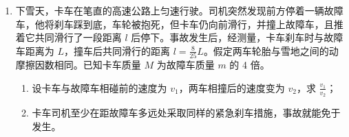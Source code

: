 \documentclass[\gkver]{gaokaozhenti}
\begin{document}
\begin{enumerate}
已知板长 $l=10\Ucm$，两板间距 $d=3.0\Ucm$，两板间电势差 $U=150\UV$，$v_{0}=2.0\times10^{7}\Ums$。

（电子所带电荷量的大小与其质量之比 $\frac{e}{m}=1.76\times10^{11}\UCkg$，电子电荷量的大小 $e=1.60\times10^{-19}\UC$）
\begin{enumerate}
	\item
	求磁感应强度 $B$ 的大小；
	\item
	若撤去磁场，求电子穿过电场时偏离入射方向的距离，以及电子通过场区后动能增加多少？
\end{enumerate}

\item
下雪天，卡车在笔直的高速公路上匀速行驶。司机突然发现前方停着一辆故障车，他将刹车踩到底，车轮被抱死，但卡车仍向前滑行，并撞上故障车，且推着它共同滑行了一段距离 $l$ 后停下。事故发生后，经测量，卡车刹车时与故障车距离为 $L$，撞车后共同滑行的距离 $l=\frac{8}{25}L$。假定两车轮胎与雪地之间的动摩擦因数相同。已知卡车质量 $M$ 为故障车质量 $m$ 的 4 倍。
\begin{enumerate}
	\item
	设卡车与故障车相碰前的速度为 $v_{1}$，两车相撞后的速度变为 $v_{2}$，求 $\frac{v_{1}}{v_{2}}$；
	\item
	卡车司机至少在距故障车多远处采取同样的紧急刹车措施，事故就能免于发生。
\end{enumerate}
\end{enumerate}
\end{document}
